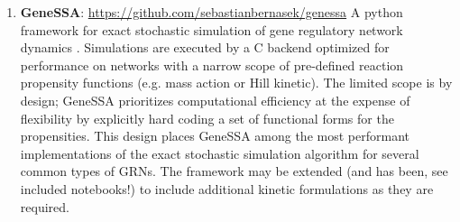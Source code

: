 \begin{enumerate}
  \item \textbf{GeneSSA}: \url{https://github.com/sebastianbernasek/genessa}
  \newline
  A python framework for exact stochastic simulation of gene regulatory network dynamics \cite{Gillespie1977}. Simulations are executed by a C backend optimized for performance on networks with a narrow scope of pre-defined reaction propensity functions (e.g. mass action or Hill kinetic). The limited scope is by design; GeneSSA prioritizes computational efficiency at the expense of flexibility by explicitly hard coding a set of functional forms for the propensities. This design places GeneSSA among the most performant implementations of the exact stochastic simulation algorithm for several common types of GRNs. The framework may be extended (and has been, see included notebooks!) to include additional kinetic formulations as they are required.
  
\end{enumerate}